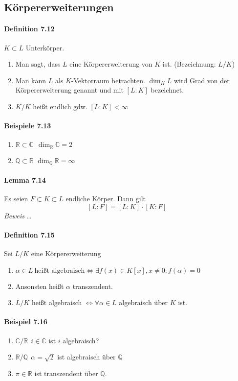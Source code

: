 \documentclass{scrartcl}
\newcommand{\Q}{\mathbb{Q}}
\newcommand{\R}{\mathbb{R}}
\newcommand{\C}{\mathbb{C}}
\begin{document}
\subsection{Körpererweiterungen}

\paragraph{Definition 7.12}
$K\subset L$ Unterkörper.
\begin{enumerate}{}
\item Man sagt, dass $L$ eine Körpererweiterung von $K$ ist. (Bezeichnung: $L/K$)
\item Man kann $L$ als $K$-Vektorraum betrachten. $\dim_KL$ wird Grad von der
  Körpererweiterung genannt und mit $[L:K]$ bezeichnet.
\item $K/K$ heißt endlich gdw. $[L:K]<\infty$
\end{enumerate}

\paragraph{Beispiele 7.13}
\begin{enumerate}{}
\item $\R \subset \C~~\dim_\R\C=2$
\item $\Q\subset\R$ $\dim_\Q\R = \infty$
\end{enumerate}

\paragraph{Lemma 7.14}
Es seien $F\subset K\subset L$ endliche Körper. Dann gilt
\[
  [L:F]=[L:K]\cdot[K:F]
\]
\textit{Beweis} \dots

\paragraph{Definition 7.15}
Sei $L/K$ eine Körpererweiterung
\begin{enumerate}
\item $\alpha\in L ~\text{heißt algebraisch}\iff \exists f(x)\in K[x],x\neq 0: f(\alpha)=0$
\item Ansonsten heißt $\alpha$ transzendent.
\item $L/K$ heißt algebraisch $\iff \forall \alpha\in L$ algebraisch über $K$ ist.
\end{enumerate}

\paragraph{Beispiel 7.16}
\begin{enumerate}{}
\item $\C/\R~~i\in\C$ ist $i$ algebraisch?
\item $\R/\Q~~\alpha =\sqrt{2}$ ist algebraisch über $\Q$
\item $\pi\in\R$ ist transzendent über $\Q$.
\end{enumerate}
\end{document}
